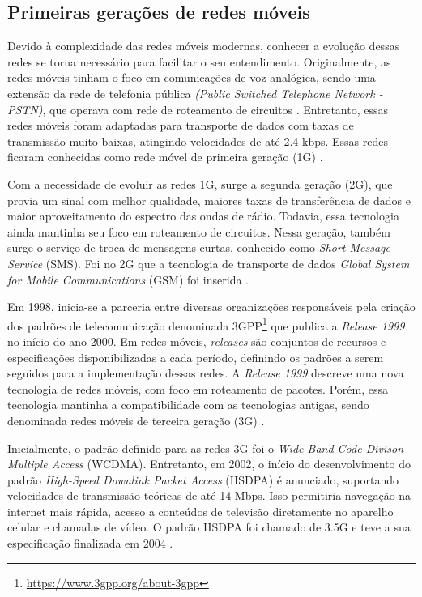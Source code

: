 \subsection{Primeiras gerações de redes móveis}

Devido à complexidade das redes móveis modernas, conhecer a evolução dessas redes se torna necessário para facilitar o seu entendimento. Originalmente, as redes móveis tinham o foco em comunicações de voz analógica, sendo uma extensão da rede de telefonia pública \textit{(Public Switched Telephone Network - PSTN)}, que operava com rede de roteamento de circuitos \cite{Cardoso2020}.
Entretanto, essas redes móveis foram adaptadas para transporte de dados com taxas de transmissão muito baixas, atingindo velocidades de até 2.4 kbps. Essas redes ficaram conhecidas como rede móvel de primeira geração (1G) \cite{vora2015evolution}.

Com a necessidade de evoluir as redes 1G, surge a segunda geração (2G), que provia um sinal com melhor qualidade, maiores taxas de transferência de dados e maior aproveitamento do espectro das ondas de rádio.
Todavia, essa tecnologia ainda mantinha seu foco em roteamento de circuitos.
Nessa geração, também surge o serviço de troca de mensagens curtas, conhecido como \textit{Short Message Service} (SMS).
Foi no 2G que a tecnologia de transporte de dados \textit{Global System for Mobile Communications} (GSM) foi inserida \cite{bhalla2010generations}.

Em 1998, inicia-se a parceria entre diversas organizações responsáveis pela criação dos padrões de telecomunicação denominada 3GPP\footnote{\url{https://www.3gpp.org/about-3gpp}} que publica a \textit{Release 1999} no início do ano 2000.
Em redes móveis, \textit{releases} são conjuntos de recursos e especificações disponibilizadas a cada período, definindo os padrões a serem seguidos para a implementação dessas redes.
A \textit{Release 1999} descreve uma nova tecnologia de redes móveis, com foco em roteamento de pacotes.
Porém, essa tecnologia mantinha a compatibilidade com as tecnologias antigas, sendo denominada redes móveis de terceira geração (3G) \cite{3gpp.01.01}.

Inicialmente, o padrão definido para as redes 3G foi o \textit{Wide-Band Code-Divison Multiple Access} (WCDMA).
Entretanto, em 2002, o início do desenvolvimento do padrão \textit{High-Speed Downlink Packet Access} (HSDPA) é anunciado, suportando velocidades de transmissão teóricas de até 14 Mbps. Isso permitiria navegação na internet mais rápida, acesso a conteúdos de televisão diretamente no aparelho celular e chamadas de vídeo. O padrão HSDPA foi chamado de 3.5G e teve a sua especificação finalizada em 2004 \cite{Lamba2012}.

